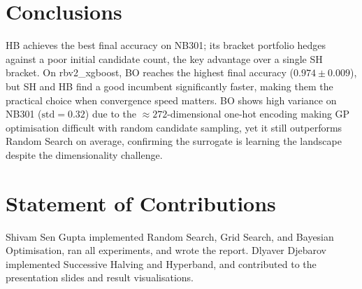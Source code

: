 \documentclass{AIM_report}
\begin{document}
\section{Conclusions}

HB achieves the best final accuracy on NB301; its bracket portfolio
hedges against a poor initial candidate count, the key advantage over
a single SH bracket.
On rbv2\_xgboost, BO reaches the highest final accuracy
($0.974{\pm}0.009$), but SH and HB find a good incumbent significantly
faster, making them the practical choice when convergence speed matters.
BO shows high variance on NB301 ($\text{std}{=}0.32$) due to the
${\approx}272$-dimensional one-hot encoding making GP optimisation
difficult with random candidate sampling, yet it still outperforms
Random Search on average, confirming the surrogate is learning the
landscape despite the dimensionality challenge.

\section*{Statement of Contributions}

Shivam Sen Gupta implemented Random Search, Grid Search, and Bayesian
Optimisation, ran all experiments, and wrote the report.
Dlyaver Djebarov implemented Successive Halving and Hyperband, and
contributed to the presentation slides and result visualisations.

\printbibliography

\newpage
\pagestyle{empty}

\end{document}
